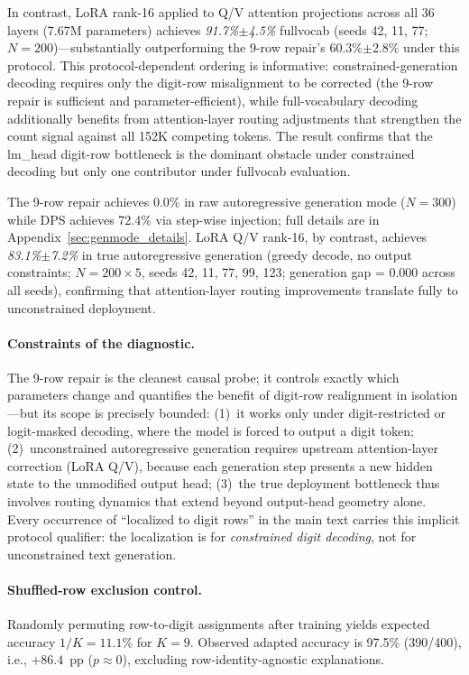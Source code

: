 \documentclass{article}
\begin{document}
In contrast, LoRA rank-16 applied to Q/V attention projections across all 36 layers (7.67M parameters) achieves \emph{91.7\%$\pm$4.5\%} fullvocab (seeds 42, 11, 77; $N{=}200$)---substantially outperforming the 9-row repair's 60.3\%$\pm$2.8\% under this protocol. This protocol-dependent ordering is informative: constrained-generation decoding requires only the digit-row misalignment to be corrected (the 9-row repair is sufficient and parameter-efficient), while full-vocabulary decoding additionally benefits from attention-layer routing adjustments that strengthen the count signal against all 152K competing tokens. The result confirms that the lm\_head digit-row bottleneck is the dominant obstacle under constrained decoding but only one contributor under fullvocab evaluation.

The 9-row repair achieves 0.0\% in raw autoregressive generation mode ($N{=}300$) while DPS achieves 72.4\% via step-wise injection; full details are in Appendix~\ref{sec:genmode_details}.
LoRA Q/V rank-16, by contrast, achieves \emph{83.1\%$\pm$7.2\%} in true autoregressive generation (greedy decode, no output constraints; $N{=}200{\times}5$, seeds 42, 11, 77, 99, 123; generation gap = 0.000 across all seeds), confirming that attention-layer routing improvements translate fully to unconstrained deployment.

\paragraph{Constraints of the diagnostic.}
The 9-row repair is the cleanest causal probe; it controls exactly which parameters change and quantifies the benefit of digit-row realignment in isolation---but its scope is precisely bounded:
(1)~it works only under digit-restricted or logit-masked decoding, where the model is forced to output a digit token;
(2)~unconstrained autoregressive generation requires upstream attention-layer correction (LoRA Q/V), because each generation step presents a new hidden state to the unmodified output head;
(3)~the true deployment bottleneck thus involves routing dynamics that extend beyond output-head geometry alone.
Every occurrence of ``localized to digit rows'' in the main text carries this implicit protocol qualifier: the localization is for \emph{constrained digit decoding}, not for unconstrained text generation.

\paragraph{Shuffled-row exclusion control.}
Randomly permuting row-to-digit assignments after training yields expected
accuracy $1/K = 11.1\%$ for $K=9$.
Observed adapted accuracy is 97.5\% (390/400), i.e., $+86.4$~pp ($p \approx 0$),
excluding row-identity-agnostic explanations.
\end{document}
